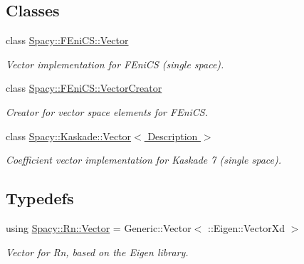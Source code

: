 \subsection*{Classes}
\begin{DoxyCompactItemize}
\item 
class \hyperlink{classSpacy_1_1FEniCS_1_1Vector}{Spacy\+::\+F\+Eni\+C\+S\+::\+Vector}
\begin{DoxyCompactList}\small\item\em Vector implementation for F\+Eni\+CS (single space). \end{DoxyCompactList}\item 
class \hyperlink{classSpacy_1_1FEniCS_1_1VectorCreator}{Spacy\+::\+F\+Eni\+C\+S\+::\+Vector\+Creator}
\begin{DoxyCompactList}\small\item\em Creator for vector space elements for F\+Eni\+CS. \end{DoxyCompactList}\item 
class \hyperlink{classSpacy_1_1Kaskade_1_1Vector}{Spacy\+::\+Kaskade\+::\+Vector$<$ Description $>$}
\begin{DoxyCompactList}\small\item\em Coefficient vector implementation for Kaskade 7 (single space). \end{DoxyCompactList}\end{DoxyCompactItemize}
\subsection*{Typedefs}
\begin{DoxyCompactItemize}
\item 
using \hyperlink{group__VectorSpaceGroup_gafda42fd5aa3f7597a42b9831bf4dfd07}{Spacy\+::\+Rn\+::\+Vector} = Generic\+::\+Vector$<$ \+::Eigen\+::\+Vector\+Xd $>$
\begin{DoxyCompactList}\small\item\em Vector for Rn, based on the Eigen library. \end{DoxyCompactList}\end{DoxyCompactItemize}
